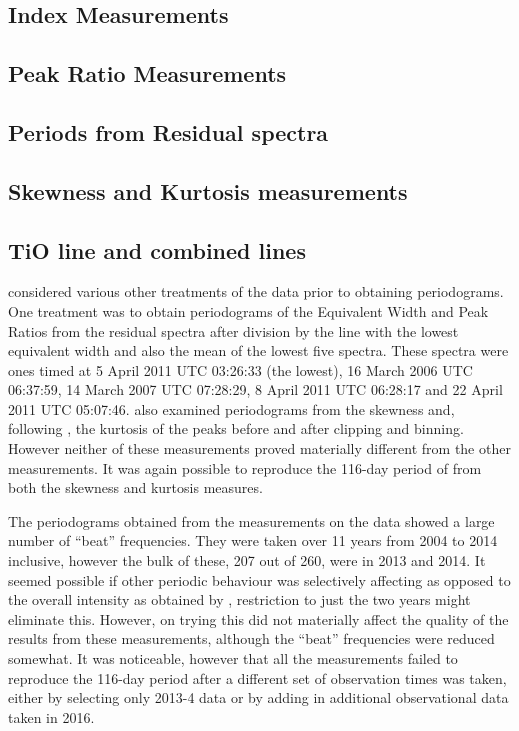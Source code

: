 \subsection{{\ha} Index Measurements}
\protect\label{section:haiper}

\subsection{Peak Ratio Measurements}
\protect\label{section:priper}

\subsection{Periods from Residual spectra}
\protect\label{section:residualper}

\subsection{Skewness and Kurtosis measurements}
\protect\label{section:skewkurtper}

\subsection{TiO line and combined lines}
\protect\label{section:tioper}

{\FirstP} considered various other treatments of the data prior to obtaining periodograms. One treatment was to obtain
periodograms of the Equivalent Width and Peak Ratios from the residual spectra after division by the line with the
lowest equivalent width and also the mean of the lowest five spectra. These spectra were ones timed at 5 April 2011 UTC
03:26:33 (the lowest), 16 March 2006 UTC 06:37:59, 14 March 2007 UTC 07:28:29, 8 April 2011 UTC 06:28:17 and 22 April
2011 UTC 05:07:46. {\FirstP} also examined periodograms from the skewness and, following \citet{flores16},
the kurtosis of the {\ha} peaks before and after clipping and binning. However neither of these measurements proved
materially different from the other measurements. It was again possible to reproduce the 116-day period of
\citet{suarezmascareno15} from both the skewness and kurtosis measures.

The periodograms obtained from the {\ha} measurements on the {\harps} data showed a large number of ``beat''
frequencies. They were taken over 11 years from 2004 to 2014 inclusive, however the bulk of these, 207 out of 260, were
in 2013 and 2014. It seemed possible if other periodic behaviour was selectively affecting {\ha} as opposed to the
overall intensity as obtained by \asas, restriction to just the two years might eliminate this. However, on trying this
did not materially affect the quality of the results from these measurements, although the ``beat'' frequencies were
reduced somewhat. It was noticeable, however that all the measurements failed to reproduce the 116-day period after a
different set of observation times was taken, either by selecting only 2013-4 data or by adding in additional
observational data taken in 2016.

